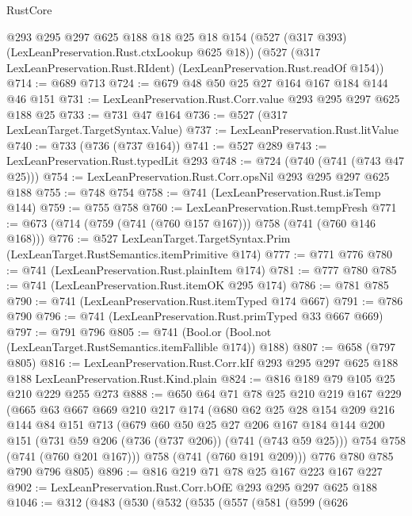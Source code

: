 \begin{lexlean}{RustCore}
\begin{coremodule}
    @293
    @295
    @297
    @625
    @188
    @18
    @25
    @18
    @154
    (@527 (@317 @393) (LexLeanPreservation.Rust.ctxLookup @625 @18))
    (@527 (@317 LexLeanPreservation.Rust.RIdent) (LexLeanPreservation.Rust.readOf @154))
@714 := @689 @713
@724 := @679 @48 @50 @25 @27 @164 @167 @184 @144 @46 @151
@731 := LexLeanPreservation.Rust.Corr.value @293 @295 @297 @625 @188 @25
@733 := @731 @47 @164
@736 := @527 (@317 LexLeanTarget.TargetSyntax.Value)
@737 := LexLeanPreservation.Rust.litValue
@740 := @733 (@736 (@737 @164))
@741 := @527 @289
@743 := LexLeanPreservation.Rust.typedLit @293
@748 := @724 (@740 (@741 (@743 @47 @25)))
@754 := LexLeanPreservation.Rust.Corr.opsNil @293 @295 @297 @625 @188
@755 := @748 @754
@758 := @741 (LexLeanPreservation.Rust.isTemp @144)
@759 := @755 @758
@760 := LexLeanPreservation.Rust.tempFresh
@771 := @673 (@714 (@759 (@741 (@760 @157 @167))) @758 (@741 (@760 @146 @168)))
@776 := @527 LexLeanTarget.TargetSyntax.Prim (LexLeanTarget.RustSemantics.itemPrimitive @174)
@777 := @771 @776
@780 := @741 (LexLeanPreservation.Rust.plainItem @174)
@781 := @777 @780
@785 := @741 (LexLeanPreservation.Rust.itemOK @295 @174)
@786 := @781 @785
@790 := @741 (LexLeanPreservation.Rust.itemTyped @174 @667)
@791 := @786 @790
@796 := @741 (LexLeanPreservation.Rust.primTyped @33 @667 @669)
@797 := @791 @796
@805 := @741 (Bool.or (Bool.not (LexLeanTarget.RustSemantics.itemFallible @174)) @188)
@807 := @658 (@797 @805)
@816 := LexLeanPreservation.Rust.Corr.kIf
    @293
    @295
    @297
    @625
    @188
    @188
    LexLeanPreservation.Rust.Kind.plain
@824 := @816 @189 @79 @105 @25 @210 @229 @255 @273
@888 := @650
    @64
    @71
    @78
    @25
    @210
    @219
    @167
    @229
    (@665
      @63
      @667
      @669
      @210
      @217
      @174
      (@680
        @62
        @25
        @28
        @154
        @209
        @216
        @144
        @84
        @151
        @713
        (@679
          @60
          @50
          @25
          @27
          @206
          @167
          @184
          @144
          @200
          @151
          (@731 @59 @206 (@736 (@737 @206)) (@741 (@743 @59 @25)))
          @754
          @758
          (@741 (@760 @201 @167)))
        @758
        (@741 (@760 @191 @209)))
      @776
      @780
      @785
      @790
      @796
      @805)
@896 := @816 @219 @71 @78 @25 @167 @223 @167 @227
@902 := LexLeanPreservation.Rust.Corr.bOfE @293 @295 @297 @625 @188
@1046 := @312
    (@483
      (@530
        (@532
          (@535
            (@557
              (@581
                (@599
                  (@626

\end{coremodule}
\end{lexlean}
